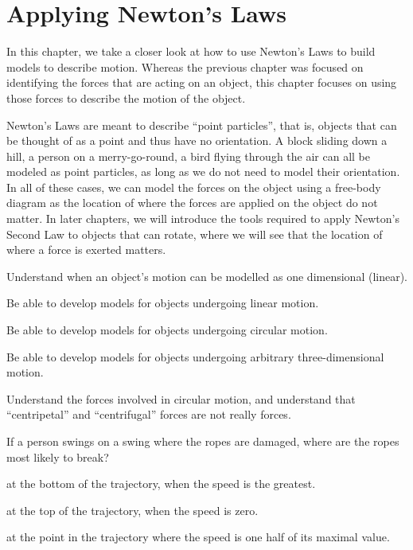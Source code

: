
\chapter{Applying Newton's Laws}
\label{chap:ApplyingNewtonsLaws}
In this chapter, we take a closer look at how to use Newton's Laws to build models to describe motion. Whereas the previous chapter was focused on identifying the forces that are acting on an object, this chapter focuses on using those forces to describe the motion of the object.

Newton's Laws are meant to describe ``point particles'', that is, objects that can be thought of as a point and thus have no orientation. A block sliding down a hill, a person on a merry-go-round, a bird flying through the air can all be modeled as point particles, as long as we do not need to model their orientation. In all of these cases, we can model the forces on the object using a free-body diagram as the location of where the forces are applied on the object do not matter. In later chapters, we will introduce the tools required to apply Newton's Second Law to objects that can rotate, where we will see that the location of where a force is exerted matters.

\begin{learningObjectives}
{
\item Understand when an object's motion can be modelled as one dimensional (linear).
\item Be able to develop models for objects undergoing linear motion.
\item Be able to develop models for objects undergoing circular motion.
\item Be able to develop models for objects undergoing arbitrary three-dimensional motion.
\item Understand the forces involved in circular motion, and understand that ``centripetal'' and ``centrifugal'' forces are not really forces.
}
\end{learningObjectives}

\begin{opening}
\begin{MCquestion}{If a person swings on a swing where the ropes are damaged, where are the ropes most likely to break? }
\item at the bottom of the trajectory, when the speed is the greatest. \correct
\item at the top of the trajectory, when the speed is zero.
\item at the point in the trajectory where the speed is one half of its maximal value.
\end{MCquestion}
\end{opening}

